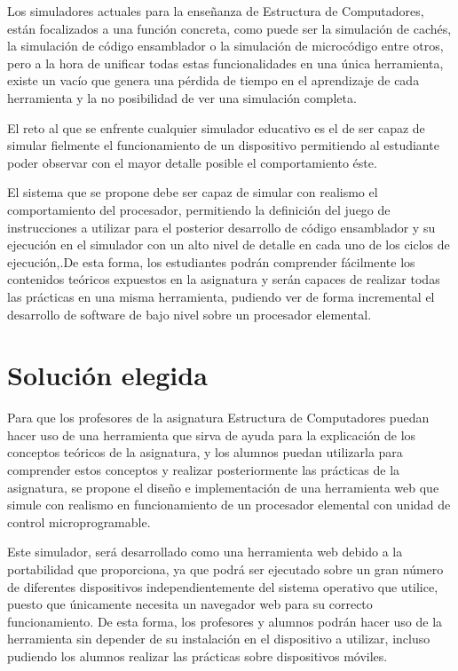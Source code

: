 Los simuladores actuales para la enseñanza de Estructura de Computadores, están focalizados a una función concreta, como puede ser la simulación de cachés, la simulación de código ensamblador o la simulación de microcódigo entre otros, pero a la hora de unificar todas estas funcionalidades en una única herramienta, existe un vacío que genera una pérdida de tiempo en el aprendizaje de cada herramienta y la no posibilidad de ver una simulación completa.

El reto al que se enfrente cualquier simulador educativo es el de ser capaz de simular fielmente el funcionamiento de un dispositivo permitiendo al estudiante poder observar con el mayor detalle posible el comportamiento éste.

El sistema que se propone debe ser capaz de simular con realismo el comportamiento del procesador, permitiendo la definición del juego de instrucciones a utilizar para el posterior desarrollo de código ensamblador y su ejecución en el simulador con un alto nivel de detalle en cada uno de los ciclos de ejecución,.De esta forma, los estudiantes podrán comprender fácilmente los contenidos teóricos expuestos en la asignatura y serán capaces de realizar todas las prácticas en una misma herramienta, pudiendo ver de forma incremental el desarrollo de software de bajo nivel sobre un procesador elemental.


\section{Solución elegida}
\label{sec:solution_selection}

Para que los profesores de la asignatura Estructura de Computadores puedan hacer uso de una herramienta que sirva de ayuda para la explicación de los conceptos teóricos de la asignatura, y los alumnos puedan utilizarla para comprender estos conceptos y realizar posteriormente las prácticas de la asignatura, se propone el diseño e implementación de una herramienta web que simule con realismo en funcionamiento de un procesador elemental con unidad de control microprogramable.

Este simulador, será desarrollado como una herramienta web debido a la portabilidad que proporciona, ya que podrá ser ejecutado sobre un gran número de diferentes dispositivos independientemente del sistema operativo que utilice, puesto que únicamente necesita un navegador web para su correcto funcionamiento. De esta forma, los profesores y alumnos podrán hacer uso de la herramienta sin depender de su instalación en el dispositivo a utilizar, incluso pudiendo los alumnos realizar las prácticas sobre dispositivos móviles.

